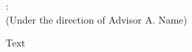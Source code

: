 
%
%
%
\vspace{-1.5\baselineskip}

\begin{singlespace}
\begin{center}
\docAuthorFull: \docTitle\\
(Under the direction of Advisor A. Name)
\end{center}
\end{singlespace}
\vspace{-0.5\baselineskip}

Text
\clearpage
